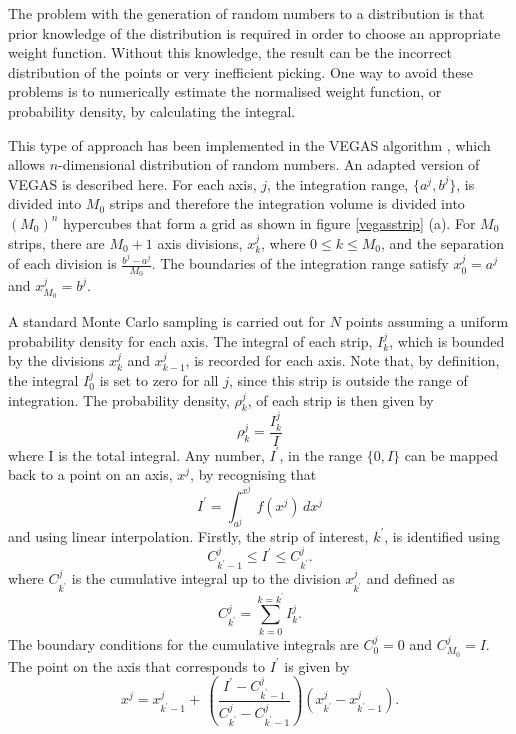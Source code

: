 The problem with the generation of random numbers to a distribution is that prior knowledge of the distribution is required in order to choose an appropriate weight function. Without this knowledge, the result can be the incorrect distribution of the points or very inefficient picking. One way to avoid these problems is to numerically estimate the normalised weight function, or probability density, by calculating the integral.


This type of approach has been implemented in the VEGAS algorithm \cite{Lepage:1980dq}, which allows $n$-dimensional distribution of random numbers. An adapted version of VEGAS is described here. 
For each axis, $j$, the integration range, $\{a^j, b^j\}$, is divided into $M_0$ strips and therefore the integration volume is divided into $(M_0)^n$ hypercubes that form a grid as shown in figure \ref{vegasstrip} (a). For $M_0$ strips, there are $M_0+1$ axis divisions, $x^j_k$, where $0\leq k \leq M_0$, and the separation of each division is $\frac{b^j - a^j}{M_0}$. The boundaries of the integration range satisfy $x^j_0 = a^j$ and $x^j_{M_0} = b^j$. 

A standard Monte Carlo sampling is carried out for $N$ points assuming a uniform probability density for each axis. The integral of each strip, $I^j_k$, which is bounded by the divisions $x_k^j$ and $x^j_{k-1}$,  is recorded for each axis. Note that, by definition, the integral $I_0^j$ is set to zero for all $j$, since this strip is outside the range of integration. The probability density, $\rho^j_k$, of each strip is then given by 
\begin{equation}\label{integralprobdensity}
\rho^j_k = \frac{ I^j_k}{I}
\end{equation}
where I is the total integral. Any number, $I^{\prime}$, in the range $\{0, I\}$ can be mapped back to a point on an axis, $x^j$, by recognising that
\begin{equation}
I^{\prime} = \int_{a^{j}}^{x^j} \, f(x^j) \, dx^j
\end{equation}
and using linear interpolation.
Firstly, the strip of interest, $k^{\prime}$, is identified using
\begin{equation}
C^j_{k^{\prime}-1} \leq I^{\prime} \leq C^j_{k^{\prime}}.
\end{equation}
where $C^j_{k^{\prime}}$ is the cumulative integral up to the division $x^j_{k^{\prime}}$ and defined as
\begin{equation}
C^j_{k^{\prime}} = \sum_{k=0}^{k=k^{\prime}} I^j_k.
\end{equation}
The boundary conditions for the cumulative integrals are $C^j_{0}=0$ and $C^j_{M_0}=I$. The point on the axis that corresponds to $I^{\prime}$ is given by
\begin{equation}\label{vegaspointmap}
x^j = x^j_{k^{\prime}-1} + \,  \left(\frac{I^{\prime} -  C^j_{k^{\prime}-1}}{C^j_{k^{\prime}} -  C^j_{k^{\prime}-1}}\right)
\left(x^j_{k^{\prime}} - x^j_{k^{\prime}-1} \right)   .
\end{equation}

